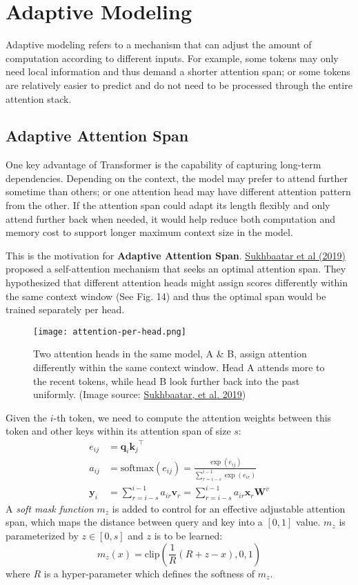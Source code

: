 \documentclass[12pt]{article}
\begin{document}
\section{Adaptive Modeling}
Adaptive modeling refers to a mechanism that can adjust the amount of computation according to different inputs. For example, some tokens may only need local information and thus demand a shorter attention span; or some tokens are relatively easier to predict and do not need to be processed through the entire attention stack.

\subsection{Adaptive Attention Span}
One key advantage of Transformer is the capability of capturing long-term dependencies. Depending on the context, the model may prefer to attend further sometime than others; or one attention head may have different attention pattern from the other. If the attention span could adapt its length flexibly and only attend further back when needed, it would help reduce both computation and memory cost to support longer maximum context size in the model.

This is the motivation for \textbf{Adaptive Attention Span}. \href{https://arxiv.org/abs/1905.07799}{Sukhbaatar et al (2019)} proposed a self-attention mechanism that seeks an optimal attention span. They hypothesized that different attention heads might assign scores differently within the same context window (See Fig. 14) and thus the optimal span would be trained separately per head.

\begin{figure}[h!]
    \centering
    \texttt{[image: attention-per-head.png]}
    \caption{Two attention heads in the same model, A \& B, assign attention differently within the same context window. Head A attends more to the recent tokens, while head B look further back into the past uniformly. (Image source: \href{https://arxiv.org/abs/1905.07799}{Sukhbaatar, et al. 2019})}
\end{figure}

Given the $i$-th token, we need to compute the attention weights between this token and other keys within its attention span of size $s$:
\[
\begin{aligned}
e_{ij} &= \mathbf{q}_i {\mathbf{k}_j}^\top \\ 
a_{ij} &= \text{softmax}(e_{ij}) = \frac{\exp(e_{ij})}{\sum_{r=i-s}^{i-1} \exp(e_{ir})} \\
\mathbf{y}_i &= \sum_{r=i-s}^{i-1}a_{ir}\mathbf{v}_r = \sum_{r=i-s}^{i-1}a_{ir}\mathbf{x}_r\mathbf{W}^v
\end{aligned}
\]
A \emph{soft mask function} $m_z$ is added to control for an effective adjustable attention span, which maps the distance between query and key into a $[0, 1]$ value. $m_z$ is parameterized by $z \in [0, s]$ and $z$ is to be learned:
\[
m_z(x) = \text{clip}\left(\frac{1}{R}(R+z-x), 0, 1\right)
\]
where $R$ is a hyper-parameter which defines the softness of $m_z$.
\end{document}
